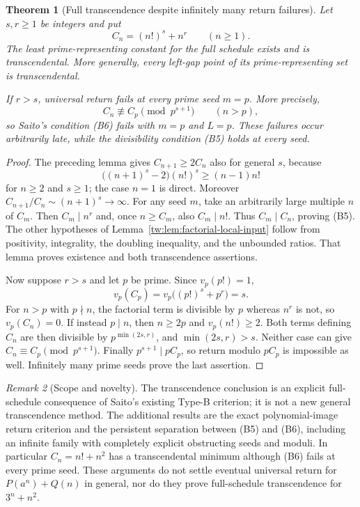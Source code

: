 \documentclass[11pt,a4paper]{article}
\newtheorem{theorem}{Theorem}[section]
\theoremstyle{definition}
\theoremstyle{remark}
\newtheorem{remark}[theorem]{Remark}
\numberwithin{equation}{section}
\begin{document}
\begin{theorem}[Full transcendence despite infinitely many return failures]
\label{tw:thm:factorial-power-full}
Let $s,r\ge1$ be integers and put
\[
 C_n=(n!)^s+n^r\qquad(n\ge1).
\]
The least prime-representing constant for the full schedule exists and
is transcendental.  More generally, every left-gap point of its
prime-representing set is transcendental.

If $r>s$, universal return fails at every prime seed $m=p$.
More precisely,
\[
 C_n\not\equiv C_p\pmod{p^{s+1}}\qquad(n>p),
\]
so Saito's condition (B6) fails with $m=p$ and $L=p$.  These failures
occur arbitrarily late, while the divisibility condition (B5) holds
at every seed.
\end{theorem}
\begin{proof}
The preceding lemma gives $C_{n+1}\ge2C_n$ also for general $s$,
because
\[
 \big((n+1)^s-2\big)(n!)^s\ge(n-1)n!
\]
for $n\ge2$ and $s\ge1$; the case $n=1$ is direct.
Moreover $C_{n+1}/C_n\sim(n+1)^s\to\infty$.
For any seed $m$, take an arbitrarily large multiple $n$ of $C_m$.
Then $C_m\mid n^r$ and, once $n\ge C_m$, also $C_m\mid n!$.
Thus $C_m\mid C_n$, proving (B5).  The other hypotheses of
Lemma~\ref{tw:lem:factorial-local-input} follow from positivity,
integrality, the doubling inequality, and the unbounded ratios.
That lemma proves existence and both transcendence assertions.

Now suppose $r>s$ and let $p$ be prime.  Since $v_p(p!)=1$,
\[
 v_p(C_p)=v_p\big((p!)^s+p^r\big)=s.
\]
For $n>p$ with $p\nmid n$, the factorial term is divisible by $p$
whereas $n^r$ is not, so $v_p(C_n)=0$.
If instead $p\mid n$, then $n\ge2p$ and $v_p(n!)\ge2$.
Both terms defining $C_n$ are then divisible by
$p^{\min(2s,r)}$, and $\min(2s,r)>s$.  Neither case can give
$C_n\equiv C_p\pmod{p^{s+1}}$.
Finally $p^{s+1}\mid pC_p$, so return modulo $pC_p$ is impossible
as well.  Infinitely many prime seeds prove the last assertion.
\end{proof}

\begin{remark}[Scope and novelty]
The transcendence conclusion is an explicit full-schedule consequence
of Saito's existing Type-B criterion; it is not a new general
transcendence method.  The additional results are the exact
polynomial-image return criterion and the persistent separation
between (B5) and (B6), including an infinite family with completely
explicit obstructing seeds and moduli.  In particular
$C_n=n!+n^2$ has a transcendental minimum although (B6) fails at every
prime seed.  These arguments do not settle eventual universal return
for $P(a^n)+Q(n)$ in general, nor do they prove full-schedule
transcendence for $3^n+n^2$.
\end{remark}
\end{document}
